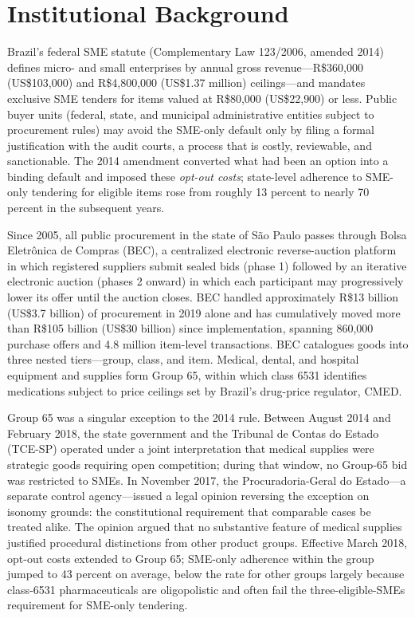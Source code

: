 \section{Institutional Background}\label{sec:institutional}

Brazil's federal SME statute (Complementary Law 123/2006, amended 2014) defines micro- and small enterprises by annual gross revenue---R\$360{,}000 (US\$103{,}000) and R\$4{,}800{,}000 (US\$1.37 million) ceilings---and mandates exclusive SME tenders for items valued at R\$80{,}000 (US\$22{,}900) or less. Public buyer units (federal, state, and municipal administrative entities subject to procurement rules) may avoid the SME-only default only by filing a formal justification with the audit courts, a process that is costly, reviewable, and sanctionable. The 2014 amendment converted what had been an option into a binding default and imposed these \emph{opt-out costs}; state-level adherence to SME-only tendering for eligible items rose from roughly 13 percent to nearly 70 percent in the subsequent years.

Since 2005, all public procurement in the state of S\~ao Paulo passes through Bolsa Eletr\^onica de Compras (BEC), a centralized electronic reverse-auction platform in which registered suppliers submit sealed bids (phase 1) followed by an iterative electronic auction (phases 2 onward) in which each participant may progressively lower its offer until the auction closes. BEC handled approximately R\$13 billion (US\$3.7 billion) of procurement in 2019 alone and has cumulatively moved more than R\$105 billion (US\$30 billion) since implementation, spanning 860{,}000 purchase offers and 4.8 million item-level transactions. BEC catalogues goods into three nested tiers---group, class, and item. Medical, dental, and hospital equipment and supplies form Group 65, within which class 6531 identifies medications subject to price ceilings set by Brazil's drug-price regulator, CMED.

Group 65 was a singular exception to the 2014 rule. Between August 2014 and February 2018, the state government and the Tribunal de Contas do Estado (TCE-SP) operated under a joint interpretation that medical supplies were strategic goods requiring open competition; during that window, no Group-65 bid was restricted to SMEs. In November 2017, the Procuradoria-Geral do Estado---a separate control agency---issued a legal opinion reversing the exception on isonomy grounds: the constitutional requirement that comparable cases be treated alike. The opinion argued that no substantive feature of medical supplies justified procedural distinctions from other product groups. Effective March 2018, opt-out costs extended to Group 65; SME-only adherence within the group jumped to 43 percent on average, below the rate for other groups largely because class-6531 pharmaceuticals are oligopolistic and often fail the three-eligible-SMEs requirement for SME-only tendering.

